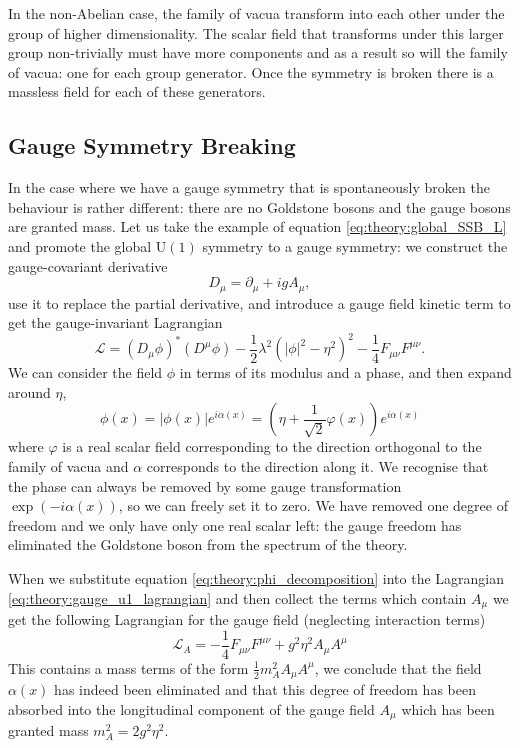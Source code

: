 In the non-Abelian case, the family of vacua transform into each other under the group of higher dimensionality. The scalar field that transforms under this larger group non-trivially must have more components and as a result so will the family of vacua: one for each group generator. Once the symmetry is broken there is a massless field for each of these generators. 

\subsection{Gauge Symmetry Breaking}
In the case where we have a gauge symmetry that is spontaneously broken the behaviour is rather different: there are no Goldstone bosons and the gauge bosons are granted mass. 
Let us take the example of equation \ref{eq:theory:global_SSB_L} and promote the global $\mathrm{U}(1)$ symmetry to a gauge symmetry: we construct the gauge-covariant derivative
%
\begin{equation}
    \label{eq:theory:gauge_cov_deriv_u1}
    D_{\mu} = \partial_{\mu} + igA_{\mu},
\end{equation}
%
use it to replace the partial derivative, and introduce a gauge field kinetic term to get the gauge-invariant Lagrangian
\begin{equation}
    \label{eq:theory:gauge_u1_lagrangian}
    \mathcal{L} = (D_{\mu}\phi)^{*}(D^{\mu}\phi) - \frac{1}{2}\lambda^{2}(|\phi|^{2} - \eta^{2})^{2} - \frac{1}{4}F_{\mu\nu}F^{\mu\nu}.
\end{equation}
%
We can consider the field $\phi$ in terms of its modulus and a phase, and then expand around $\eta$,
\begin{equation}
    \label{eq:theory:phi_decomposition}
    \phi(x) = |\phi(x)|e^{i\alpha(x)} = (\eta + \frac{1}{\sqrt{2}}\varphi(x))e^{i\alpha(x)}
\end{equation}
where $\varphi$ is a real scalar field corresponding to the direction orthogonal to the family of vacua and $\alpha$ corresponds to the direction along it. 
We recognise that the phase can always be removed by some gauge transformation $\exp(-i\alpha(x))$, so we can freely set it to zero. 
We have removed one degree of freedom and we only have only one real scalar left: the gauge freedom has eliminated the Goldstone boson from the spectrum of the theory.


When we substitute equation \ref{eq:theory:phi_decomposition} into the Lagrangian \ref{eq:theory:gauge_u1_lagrangian} and then collect the terms which contain $A_{\mu}$ we get the following Lagrangian for the gauge field (neglecting interaction terms)
\begin{equation}
    \label{eq:theory:abelian_gaugefield_L}
    \mathcal{L}_{A} = -\frac{1}{4}F_{\mu\nu}F^{\mu\nu} + g^{2}\eta^{2}A_{\mu}A^{\mu} %
\end{equation}
This contains a mass terms of the form $\frac{1}{2}m_{A}^{2}A_{\mu}A^{\mu}$, we conclude that the field $\alpha(x)$ has indeed been eliminated and that this degree of freedom has been absorbed into the longitudinal component of the gauge field $A_{\mu}$ which has been granted mass $m_{A}^{2}=2g^{2}\eta^{2}$. 



